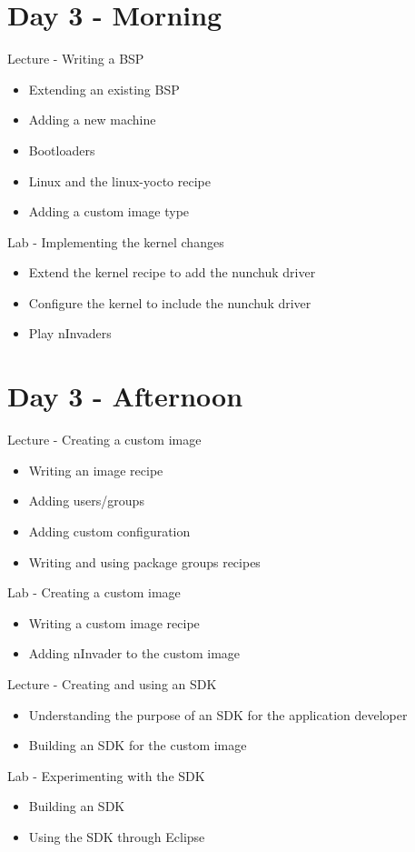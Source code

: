 \documentclass[a4paper,12pt,obeyspaces,spaces,hyphens]{article}
\begin{document}
\section{Day 3 - Morning}

\feagendatwocolumn
{Lecture - Writing a BSP}
{
  \begin{itemize}
  \item Extending an existing BSP
  \item Adding a new machine
  \item Bootloaders
  \item Linux and the linux-yocto recipe
  \item Adding a custom image type
  \end{itemize}
}
{Lab - Implementing the kernel changes}
{
  \begin{itemize}
  \item Extend the kernel recipe to add the nunchuk driver
  \item Configure the kernel to include the nunchuk driver
  \item Play nInvaders
  \end{itemize}
}

\section{Day 3 - Afternoon}

\feagendatwocolumn
{Lecture - Creating a custom image}
{
  \begin{itemize}
  \item Writing an image recipe
  \item Adding users/groups
  \item Adding custom configuration
  \item Writing and using package groups recipes
  \end{itemize}
}
{Lab - Creating a custom image}
{
  \begin{itemize}
  \item Writing a custom image recipe
  \item Adding nInvader to the custom image
  \end{itemize}
}
\feagendatwocolumn
{Lecture - Creating and using an SDK}
{
  \begin{itemize}
  \item Understanding the purpose of an SDK for the application
    developer
  \item Building an SDK for the custom image
  \end{itemize}
}
{Lab - Experimenting with the SDK}
{
  \begin{itemize}
  \item Building an SDK
  \item Using the SDK through Eclipse
  \end{itemize}
}
\end{document}

